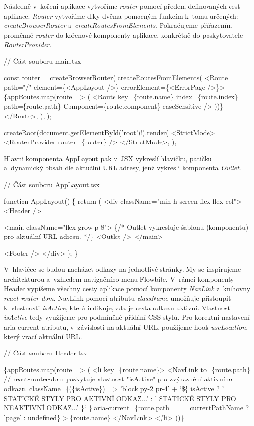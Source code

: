 Následně v~kořeni aplikace vytvoříme \emph{router} pomocí předem definovaných cest aplikace. 
\emph{Router} vytvoříme díky dvěma pomocným funkcím k~tomu určených: \emph{createBrowserRouter} a~\emph{createRoutesFromElements}. 
Pokračujeme přiřazením proměnné \emph{router} do kořenové komponenty aplikace, konkrétně do poskytovatele \emph{RouterProvider}.

\begin{prog}
// Část souboru main.tsx

const router = createBrowserRouter(
  createRoutesFromElements(
    <Route path="/" element=\{<AppLayout />\} errorElement=\{<ErrorPage />\}>
      \{appRoutes.map(route => (
        <Route
          key=\{route.name\}
          index=\{route.index\}
          path=\{route.path\}
          Component=\{route.component\}
          caseSensitive
        />
      ))\}
    </Route>,
  ),
);

createRoot(document.getElementById('root')!).render(
  <StrictMode>
    <RouterProvider router=\{router\} />
  </StrictMode>,
);
\end{prog}

Hlavní komponenta AppLayout pak v~JSX vykreslí hlavičku, patičku a~dynamický obsah dle aktuální URL adresy, jenž vykreslí komponenta \emph{Outlet}.

\begin{prog}
// Část souboru AppLayout.tsx

function AppLayout() \{
  return (
    <div className="min-h-screen flex flex-col">
      <Header />

      <main className="flex-grow p-8">
        \{/* Outlet vykresluje šablonu (komponentu) pro aktuální URL adresu. */\}
        <Outlet />
      </main>

      <Footer />
    </div>
  );
\}
\end{prog}

V~hlavičce se budou nacházet odkazy na jednotlivé stránky. My se inspirujeme architekturou a~vzhledem navigačního menu Flowbite. 
V~rámci komponenty Header vypíšeme všechny cesty aplikace pomocí komponenty \emph{NavLink} z~knihovny \emph{react-router-dom}. 
NavLink pomocí atributu \emph{className} umožňuje přistoupit k~vlastnosti \emph{isActive}, která indikuje, zda je cesta odkazu aktivní. 
Vlastnosti \emph{isActive} tedy využijeme pro podmíněné přidání CSS stylů. Pro korektní nastavení aria-current atributu, v~závislosti na aktuální URL, použijeme hook \emph{useLocation}, který vrací aktuální URL.

\begin{prog}
// Část souboru Header.tsx

\{appRoutes.map(route => (
  <li key=\{route.name\}>
    <NavLink
      to=\{route.path\}
      // react-router-dom poskytuje vlastnost "isActive"
        pro zvýraznění aktivního odkazu.
      className=\{(\{isActive\}) =>
        'block py-2 pr-4' +
        `\$\{
          isActive
            ? ' STATICKÉ STYLY PRO AKTIVNÍ ODKAZ...'
            : ' STATICKÉ STYLY PRO NEAKTIVNÍ ODKAZ...'
        \}`
      \}
      aria-current=\{route.path === currentPathName ? 'page' : undefined\}
    >
      \{route.name\}
    </NavLink>
  </li>
))\}
\end{prog}

